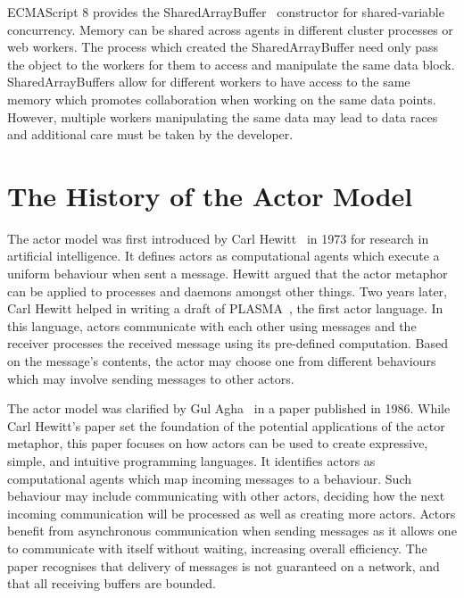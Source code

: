 \documentclass[oneside]{um-fict}
\begin{document}
ECMAScript 8 provides the SharedArrayBuffer~\cite{sharedarraybuffer} constructor for shared-variable concurrency. Memory can be shared across agents in different cluster processes or web workers. The process which created the SharedArrayBuffer need only pass the object to the workers for them to access and manipulate the same data block. SharedArrayBuffers allow for different workers to have access to the same memory which promotes collaboration when working on the same data points. However, multiple workers manipulating the same data may lead to data races and additional care must be taken by the developer.

\section{The History of the Actor Model}
The actor model was first introduced by Carl Hewitt~\cite{hewitt1973session, 43years} in 1973 for research in artificial intelligence. It defines actors as computational agents which execute a uniform behaviour when sent a message. Hewitt argued that the actor metaphor can be applied to processes and daemons amongst other things. Two years later, Carl Hewitt helped in writing a draft of PLASMA~\cite{plasma, chewitthowto}, the first actor language. In this language, actors communicate with each other using messages and the receiver processes the received message using its pre-defined computation. Based on the message's contents, the actor may choose one from different behaviours which may involve sending messages to other actors.

The actor model was clarified by Gul Agha~\cite{agha1985actors} in a paper published in 1986. While Carl Hewitt's paper set the foundation of the potential applications of the actor metaphor, this paper focuses on how actors can be used to create expressive, simple, and intuitive programming languages. It identifies actors as computational agents which map incoming messages to a behaviour. Such behaviour may include communicating with other actors, deciding how the next incoming communication will be processed as well as creating more actors. Actors benefit from asynchronous communication when sending messages as it allows one to communicate with itself without waiting, increasing overall efficiency. The paper recognises that delivery of messages is not guaranteed on a network, and that all receiving buffers are bounded.
\end{document}
